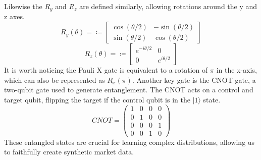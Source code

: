 \documentclass[12pt]{article}
\numberwithin{equation}{section}
\begin{document}
Likewise the $R_y$ and $R_z$ are defined similarly, allowing rotations around the 
y and z axes.
$$
R_y(\theta) = \coloneqq 
\begin{bmatrix}
\cos(\theta/2) & -\sin(\theta/2) \\
\sin(\theta/2) & \cos(\theta/2)
\end{bmatrix}
$$
$$
R_z(\theta) = \coloneqq 
\begin{bmatrix}
e^{-i\theta/2} & 0 \\
0 & e^{i\theta/2}
\end{bmatrix}
$$
It is worth noticing the Pauli X gate is equivalent to a rotation of $\pi$ in the 
x-axis, which can also be represented as $R_x(\pi)$. 
Another key gate is the CNOT gate, a two-qubit gate used to generate entanglement. 
The CNOT acts on a control and target qubit, flipping the target if the control 
qubit is in the $|1\rangle$ state. 
$$
CNOT =
\begin{pmatrix}
1 & 0 & 0 & 0 \\
0 & 1 & 0 & 0 \\
0 & 0 & 0 & 1 \\
0 & 0 & 1 & 0
\end{pmatrix}
$$
These entangled states are crucial for learning complex distributions, allowing us 
to faithfully create synthetic market data. 
\end{document}
